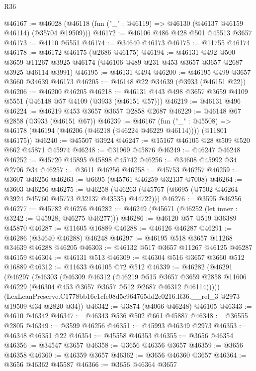 \begin{lexlean}{R36}
\begin{coremodule}
@46167 := @46028 (@46118 (fun ("_" : @46119) => @46130 (@46137 @46159 @46114) (@35704 @19509)))
@46172 := @46106 @486 @428 @501 @45513 @3657
@46173 := @4110 @5551
@46174 := @34640 @46173
@46175 := @11755 @46174
@46178 := @46172 @46175 (@2686 @46175)
@46194 := @46131
    @492
    @500
    @3659
    @11267
    @3925
    @46174
    (@46106 @489 @231 @453 @3657 @3657 @2687 @3925 @46114 @3991)
@46195 := @46131 @494
@46200 := @46195 @499 @3657 @3660 @34639 @46173
@46205 := @46148 @22 @34639 (@3933 (@46151 @22))
@46206 := @46200 @46205
@46218 := @46131 @443 @498 @3657 @3659 @4109 @5551 (@46148 @57 @4109 (@3933 (@46151 @57)))
@46219 := @46131 @496
@46224 := @46219 @453 @3657 @3657 @2858 @2687
@46229 := @46148 @67 @2858 (@3933 (@46151 @67))
@46239 := @46167
    (fun ("_" : @45508) => @46178 (@46194 (@46206 (@46218 (@46224 @46229 @46114)))) (@11801 @46175))
@46240 := @45507 @3924
@46247 := @15167 @46105 @28 @509 @520 @662 @45871 @45974
@46248 := @31969 @45876
@46249 := @46247 @46248
@46252 := @45720 @45895 @45898 @45742
@46256 := @34608 @45992 @34 @2796 @34
@46257 := @3611 @46256
@46258 := @45753 @46257
@46259 := @3607 @46256
@46263 := @6695 (@45761 @46259 @32137 @7008)
@46264 := @3603 @46256
@46275 := @46258 (@46263 (@45767 (@6695 (@7502 @46264 @3924 @45760 @45773 @32137 @43535) @44722)))
@46276 := @3595 @46256
@46277 := @45782 @46276
@46282 := @46249 (@45671 (@46252 (let inner : @3242 := @45928; @46275 @46277)))
@46286 := @46120 @57 @519 @36389 @45870
@46287 := @11605 @16889
@46288 := @46126 @46287
@46291 := @46286 (@34640 @46288) @46248
@46297 := @46195 @518 @3657 @11268 @34639 @46288 @46205
@46303 := @46132 @517 @3657 @11267 @46125 @46287 @46159
@46304 := @46131 @513
@46309 := @46304 @516 @3657 @3660 @512 @16889
@46312 := @11633 @46105 @72 @512
@46339 := @46282
    (@46291
      (@46297
        (@46303
          (@46309
            @46312
            (@46219
              @515
              @3657
              @3659
              @2858
              @11606
              @46229
              (@46304 @453 @3657 @3657 @512 @2687 @46312 @46114)))))
      (LexLeanPreserve.C1778bb16c1cfe08d5e964765dd2c0216.R36.__rel_3 @2973 @19509 @34 @2820 @34))
@46342 := @3874 (@4066 @46248) @46105
@46343 := @4610 @46342
@46347 := @46343 @536 @502 @661 @45887
@46348 := @36555 @2805
@46349 := @3599 @46256
@46351 := @45993 @46349 @2973
@46353 := @46348 @46351 @22
@46354 := @45558 @46353
@46355 := @3656 @46354
@46356 := @34547 @3657
@46358 := @3656 @46356 @3657
@46359 := @3656 @46358
@46360 := @46359 @3657
@46362 := @3656 @46360 @3657
@46364 := @3656 @46362 @45587
@46366 := @3656 @46364 @3657

\end{coremodule}
\end{lexlean}
